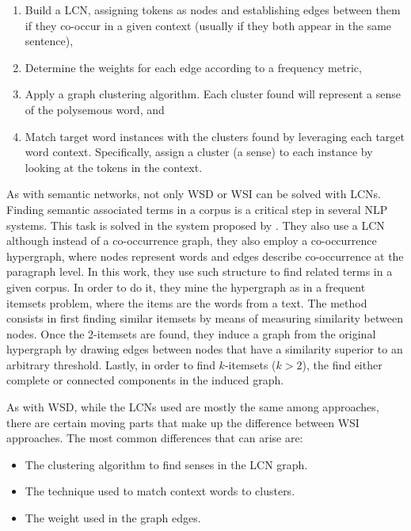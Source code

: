 \begin{enumerate}
\item Build a LCN, assigning tokens as nodes and  establishing edges between them if they co-occur in a given context (usually if they both appear in the same sentence),
\item Determine the weights for each edge according to a frequency metric,
\item Apply a graph clustering algorithm. Each cluster found will represent a sense of the polysemous word, and
\item Match  target word instances with the clusters found by leveraging each target word context. Specifically, assign a cluster (a sense) to each instance by looking at the tokens in the context.
\end{enumerate}

As with semantic networks, not only WSD or WSI can be solved with LCNs. Finding semantic associated terms in a corpus is a critical step in several NLP systems. This task is solved in the system proposed by \cite{2011.Haishan.AHypergraphbased}. They also use a LCN although instead of a co-occurrence graph, they also employ a co-occurrence hypergraph, where nodes represent words and edges describe co-occurrence at the paragraph level.  In this work, they use such structure to find related terms in a given corpus. In order to do it, they mine the hypergraph as in a frequent itemsets problem, where the items are the words from a text. The method consists in first finding similar itemsets by means of measuring similarity between nodes. Once the 2-itemsets are found, they induce a graph from the original hypergraph by drawing edges between nodes that have a similarity superior to an arbitrary threshold. Lastly, in order to find $k$-itemsets ($k > 2$), the find either complete or connected components in the induced graph. 



As with WSD, while the LCNs used are mostly the same among approaches, there are certain moving parts that make up the difference between WSI approaches. The most common differences that can arise are:

\begin{itemize}
\item The clustering algorithm to find senses in the LCN graph.
\item The technique used to match context words to clusters.
\item The weight used in the graph edges.
\end{itemize}



